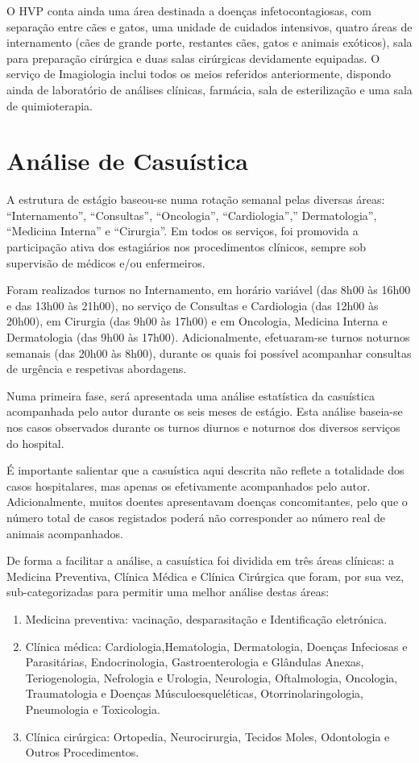 O HVP conta ainda uma área destinada a doenças infetocontagiosas, com separação entre cães e gatos, uma unidade de cuidados intensivos, quatro áreas de internamento (cães de grande porte, restantes cães, gatos e animais exóticos), sala para preparação cirúrgica e duas salas cirúrgicas devidamente equipadas. O serviço de Imagiologia inclui todos os meios referidos anteriormente, dispondo ainda de laboratório de análises clínicas, farmácia, sala de esterilização e uma sala de quimioterapia.

\section{Análise de Casuística}

A estrutura de estágio baseou-se numa rotação semanal pelas diversas áreas: “Internamento”, “Consultas”, “Oncologia”, “Cardiologia”,” Dermatologia”, “Medicina Interna” e “Cirurgia”. Em todos os serviços, foi promovida a participação ativa dos estagiários nos procedimentos clínicos, sempre sob supervisão de médicos e/ou enfermeiros.

Foram realizados turnos no Internamento, em horário variável (das 8h00 às 16h00 e das 13h00 às 21h00), no serviço de Consultas e Cardiologia (das 12h00 às 20h00), em Cirurgia (das 9h00 às 17h00) e em Oncologia, Medicina Interna e Dermatologia (das 9h00 às 17h00). Adicionalmente, efetuaram-se turnos noturnos semanais (das 20h00 às 8h00), durante os quais foi possível acompanhar consultas de urgência e respetivas abordagens.

Numa primeira fase, será apresentada uma análise estatística da casuística acompanhada pelo autor durante os seis meses de estágio. Esta análise baseia-se nos casos observados durante os turnos diurnos e noturnos dos diversos serviços do hospital.

É importante salientar que a casuística aqui descrita não reflete a totalidade dos casos hospitalares, mas apenas os efetivamente acompanhados pelo autor. Adicionalmente, muitos doentes apresentavam doenças concomitantes, pelo que o número total de casos registados poderá não corresponder ao número real de animais acompanhados.

De forma a facilitar a análise, a casuística foi dividida em três áreas clínicas: a Medicina Preventiva, Clínica Médica e Clínica Cirúrgica que foram, por sua vez, sub-categorizadas para permitir uma melhor análise destas áreas:

\begin{enumerate}
    \item Medicina preventiva: vacinação, desparasitação e Identificação eletrónica.
    \item 	Clínica médica: Cardiologia,Hematologia, Dermatologia, Doenças Infeciosas e Parasitárias, Endocrinologia, Gastroenterologia e Glândulas Anexas, Teriogenologia, Nefrologia e Urologia, Neurologia, Oftalmologia, Oncologia, Traumatologia e Doenças Músculoesqueléticas, Otorrinolaringologia, Pneumologia e Toxicologia. 
    \item Clínica cirúrgica: Ortopedia, Neurocirurgia, Tecidos Moles, Odontologia e Outros Procedimentos.
\end{enumerate}


